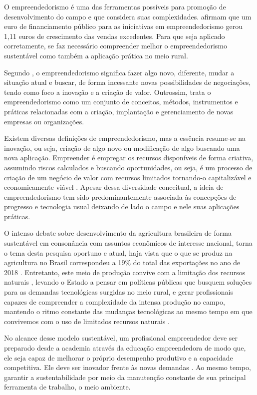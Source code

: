 O empreendedorismo é uma das ferramentas possíveis para promoção de desenvolvimento do campo e que considera suas complexidades.  afirmam que um euro de financiamento público para as iniciativas em empreendedorismo gerou 1,11 euros de crescimento das vendas excedentes. Para que seja aplicado corretamente, se faz necessário compreender melhor o empreendedorismo sustentável como também a aplicação prática no meio rural. 

Segundo , o empreendedorismo significa fazer algo novo, diferente, mudar a situação atual e buscar, de forma incessante novas possibilidades de negociações, tendo como foco a inovação e a criação de valor. Outrossim,  trata o empreendedorismo como um conjunto de conceitos, métodos, instrumentos e práticas relacionadas com a criação, implantação e gerenciamento de novas empresas ou organizações.

Existem diversas definições de empreendedorismo, mas a essência resume-se na inovação, ou seja, criação de algo novo ou modificação de algo buscando uma nova aplicação. Empreender é empregar os recursos disponíveis de forma criativa, assumindo riscos calculados e buscando oportunidades, ou seja, é um processo de criação de um negócio de valor com recursos limitados tornando-o capitalizável e economicamente viável \cite{costa_empreendedorismo_2006, lopes_educacao_2010}. Apesar dessa diversidade conceitual, a ideia de empreendedorismo tem sido predominantemente associada às concepções de progresso e tecnologia usual deixando de lado o campo e nele suas aplicações práticas.
 
O intenso debate sobre desenvolvimento da agricultura brasileira de forma sustentável em consonância com assuntos econômicos de interesse nacional, torna o tema desta pesquisa oportuno e atual, haja vista que o que se produz na agricultura no Brasil correspondeu a 19\% do total das exportações no ano de 2018 \cite{mdic_comex_2019}. Entretanto, este meio de produção convive com a limitação dos recursos naturais \cite{jacobi_meio_1999}, levando o Estado a pensar em políticas públicas que busquem soluções para as demandas tecnológicas surgidas no meio rural, e gerar profissionais capazes de compreender a complexidade da intensa produção no campo, mantendo o ritmo constante das mudanças tecnológicas ao mesmo tempo em que convivemos com o uso de limitados recursos naturais  \cite{costa_dinamica_2016}.

No alcance desse modelo sustentável, um profissional empreendedor deve ser preparado desde a academia através da educação empreendedora de modo que, ele seja capaz de melhorar o próprio desempenho produtivo \cite{da_silva_qualidade_2017} e a capacidade competitiva\cite{hoffmann_brasil_2015}. Ele deve ser inovador frente às novas demandas \cite{morais_empreendedorismo_2018}. Ao mesmo tempo, garantir a sustentabilidade por meio da manutenção constante de sua principal ferramenta de trabalho, o meio ambiente.

